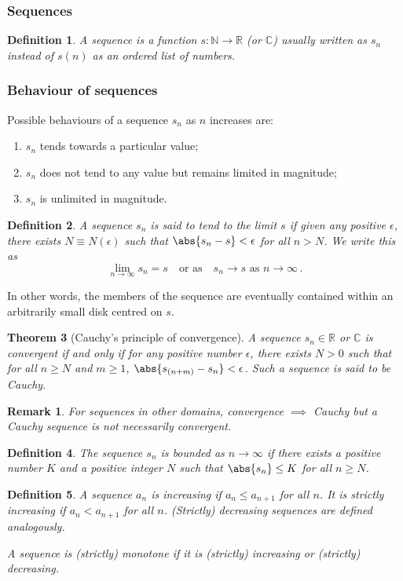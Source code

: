 \documentclass{article}
\theoremstyle{plain}\theoremheaderfont{\normalfont\itshape}\theorembodyfont{\rmfamily}\theoremseparator{.}\newtheorem*{rem}{Remark}\newtheorem*{ex}{Example}\newtheorem*{proof}{Proof}\newtheorem*{altp}{Alternative proof}
\theoremstyle{plain}\theoremheaderfont{\normalfont\bfseries}\theorembodyfont{\rmfamily}\theoremseparator{.}\newtheorem{thm}{Theorem}[section]\newtheorem{lem}[thm]{Lemma}\newtheorem{prop}[thm]{Proposition}\newtheorem*{cor}{Corollary}\newtheorem{defn}[thm]{Definition}\newtheorem{clm}[thm]{Claim}\newtheorem{clminproof}{Claim}
\theoremstyle{break}\theoremheaderfont{\normalfont\itshape}\theorembodyfont{\rmfamily}\theoremseparator{.\medskip}\newtheorem*{proofskip}{Proof}\newtheorem*{exs}{Examples}\newtheorem*{rems}{Remarks}
\theoremstyle{break}\theoremheaderfont{\normalfont\bfseries}\theorembodyfont{\rmfamily}\theoremseparator{.\medskip}\newtheorem{lemskip}[thm]{Lemma}\newtheorem{defnskip}[thm]{Definition}\newtheorem{propskip}[thm]{Proposition}\newtheorem{thmskip}[thm]{Theorem}
\numberwithin{equation}{section}
\begin{document}
	\subsubsection{Sequences}
	\begin{defn}
		A \textit{sequence} is a function \(s:\mathbb{N}\to\mathbb{R}\) (or \(\mathbb{C}\)) usually written as \(s_n\) instead of \(s(n)\) as an ordered list of numbers.
	\end{defn}
	\subsubsection{Behaviour of sequences}
	Possible behaviours of a sequence \(s_n\) as \(n\) increases are:
	\begin{enumerate}[topsep=0pt]
		\item \(s_n\) tends towards a particular value;
		\item \(s_n\) does not tend to any value but remains limited in magnitude;
		\item \(s_n\) is unlimited in magnitude.
	\end{enumerate}

	\begin{defn}
		A sequence \(s_n\) is said to tend to the \textit{limit} \(s\) if given any positive \(\epsilon\), there exists \(N\equiv N(\epsilon)\) such that \(\abs{s_n-s}<\epsilon\) for all \(n>N\). We write this as
		\[\lim_{n\to\infty}s_n = s\quad\text{or as}\quad s_n\to s\text{ as }n\to\infty\,.\]
	\end{defn}
	In other words, the members of the sequence are eventually contained within an arbitrarily small disk centred on \(s\).
	\begin{thm}[Cauchy's principle of convergence]
		A sequence \(s_n\in\mathbb{R}\) or \(\mathbb{C}\) is convergent if and only if for any positive number \(\epsilon\), there exists \(N>0\) such that for all \(n\ge N\) and \(m\ge 1\), \(\abs{s_{(n+m)}-s_n}<\epsilon\). Such a sequence is said to be \textit{Cauchy}.
	\end{thm}
	\begin{rem}
		For sequences in other domains, convergence \(\implies\) Cauchy but a Cauchy sequence is not necessarily convergent.
	\end{rem}
	\begin{defn}
		The sequence \(s_n\) is \textit{bounded} as \(n\to\infty\) if there exists a positive number \(K\) and a positive integer \(N\) such that \(\abs{s_n}\le K\) for all \(n\ge N\).
	\end{defn}
	\begin{defn}
		A sequence \(a_n\) is \textit{increasing} if \(a_n\le a_{n+1}\) for all \(n\). It is \textit{strictly increasing} if \(a_n < a_{n+1}\) for all \(n\). \textit{(Strictly) decreasing} sequences are defined analogously.
		
		A sequence is \textit{(strictly) monotone} if it is (strictly) increasing or (strictly) decreasing.
	\end{defn}
\end{document}
